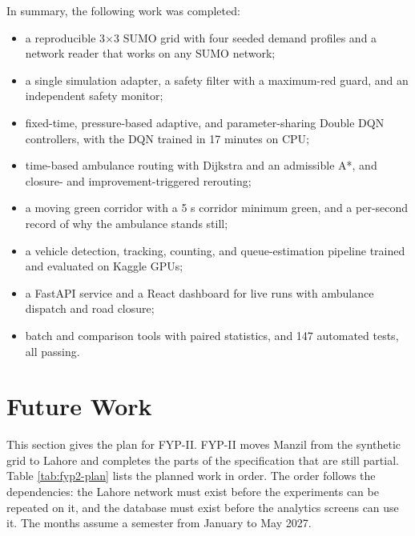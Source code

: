 In summary, the following work was completed:
\begin{itemize}[itemsep=0pt]
\item a reproducible 3$\times$3 SUMO grid with four seeded demand profiles and a network reader that works on any SUMO network;
\item a single simulation adapter, a safety filter with a maximum-red guard, and an independent safety monitor;
\item fixed-time, pressure-based adaptive, and parameter-sharing Double DQN controllers, with the DQN trained in 17 minutes on CPU;
\item time-based ambulance routing with Dijkstra and an admissible A*, and closure- and improvement-triggered rerouting;
\item a moving green corridor with a 5 s corridor minimum green, and a per-second record of why the ambulance stands still;
\item a vehicle detection, tracking, counting, and queue-estimation pipeline trained and evaluated on Kaggle GPUs;
\item a FastAPI service and a React dashboard for live runs with ambulance dispatch and road closure;
\item batch and comparison tools with paired statistics, and 147 automated tests, all passing.
\end{itemize}

\section{Future Work}

This section gives the plan for FYP-II. FYP-II moves Manzil from the synthetic grid to Lahore and completes the parts of the specification that are still partial. Table \ref{tab:fyp2-plan} lists the planned work in order. The order follows the dependencies: the Lahore network must exist before the experiments can be repeated on it, and the database must exist before the analytics screens can use it. The months assume a semester from January to May 2027.

